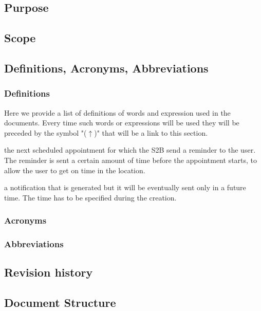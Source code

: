 \subsection{Purpose}
	
\subsection{Scope}
	
\subsection{Definitions, Acronyms, Abbreviations}
	\subsubsection{Definitions}
	\label{definitions}
	Here we provide a list of definitions of words and expression used in the documents. Every time such words or expressions will be used they will be preceded by the symbol "($\uparrow$)" that will be a link to this section.
	\begin{description}[before={\renewcommand{\makelabel}[1]{-- \textbf{\textit{##1}}:}}]
		\item[Incoming Appointment] the next scheduled appointment for which the S2B send a reminder to the user. The reminder is sent  a certain amount of time before the appointment starts, to allow the user to get on time in the location.
		\item[Future Notification] a notification that is generated but it will be eventually sent only in a future time. The time has to be specified during the creation.
	\end{description}
	\subsubsection{Acronyms}
	\subsubsection{Abbreviations}
	
\subsection{Revision history}
	
\subsection{Document Structure}
